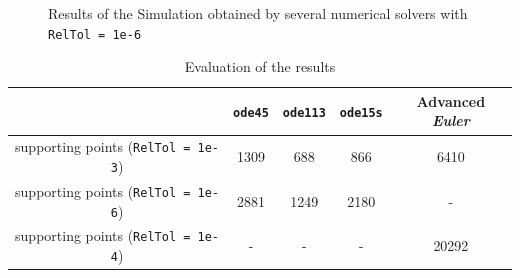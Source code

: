 \documentclass[11pt,a4paper,oneside]{scrartcl}
\begin{document}
\begin{figure}
\begin{centering}
\end{centering}
\caption{Results of the Simulation obtained by several numerical solvers with \texttt{RelTol = 1e-6}}
\label{fig:sol_1e-6}
\end{figure}
\begin{table}
\begin{center}
\begin{tabular}{c|cccc}
 & \texttt{ode45} & \texttt{ode113} & \texttt{ode15s} & Advanced \textit{Euler} \\ 
\hline 
supporting points (\texttt{RelTol = 1e-3}) & 1309 & 688 & 866 & 6410 \\ 
supporting points (\texttt{RelTol = 1e-6}) & 2881 & 1249 & 2180 & - \\ 
supporting points (\texttt{RelTol = 1e-4}) & - & - & - & 20292 \\ 
\end{tabular} 
\end{center}
\caption{Evaluation of the results}
\label{tab:eva}
\end{table}
\end{document}
